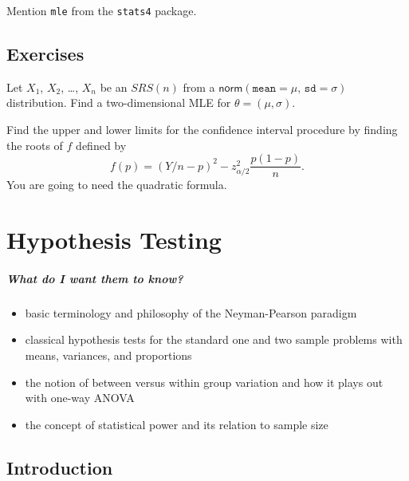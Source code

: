 \documentclass[captions=tableheading]{scrbook}
\begin{document}
\label{sec:Other-Topics}

Mention \texttt{mle} from the \texttt{stats4} package.

\newpage{}
\section{Exercises}
\label{sec-9-9}

\setcounter{thm}{0}

\begin{xca}
Let \(X_{1}\), \(X_{2}\), \ldots{}, \(X_{n}\) be an \(SRS(n)\) from a \(\mathsf{norm}(\mathtt{mean}=\mu,\,\mathtt{sd}=\sigma)\) distribution. Find a two-dimensional MLE for \(\theta=(\mu,\sigma)\).
\label{xca:norm-mu-sig-MLE}
\end{xca}

\begin{xca}
\label{xca:CI-quad-form}
Find the upper and lower limits for the confidence interval procedure by finding the roots of \(f\) defined by 
\[
f(p)=\left(Y/n-p\right)^{2}-z_{\alpha/2}^{2}\frac{p(1-p)}{n}.
\]
You are going to need the quadratic formula.
\end{xca}
\chapter{Hypothesis Testing}
\label{sec-10}

\label{cha:Hypothesis-Testing}

\paragraph*{What do I want them to know?}

\begin{itemize}
\item basic terminology and philosophy of the Neyman-Pearson paradigm
\item classical hypothesis tests for the standard one and two sample problems with means, variances, and proportions
\item the notion of between versus within group variation and how it plays out with one-way ANOVA
\item the concept of statistical power and its relation to sample size
\end{itemize}
\section{Introduction}
\label{sec-10-1}
\end{document}
